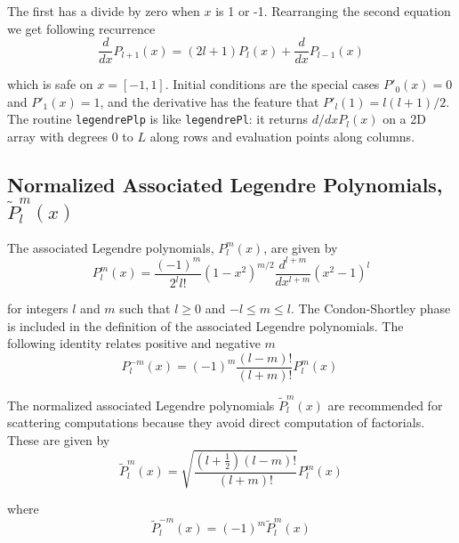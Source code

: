 The first has a divide by zero when $x$ is 1 or -1.  Rearranging the second equation we get following recurrence 
\begin{equation}
\dfrac{d}{dx}P_{l+1}(x) = (2l+1)P_l(x) + \dfrac{d}{dx} P_{l-1}(x)
\end{equation}

\noindent which is safe on $x=[-1, 1]$.  Initial conditions are the special cases $P'_0(x) = 0$ and $P'_1(x) = 1$, and the derivative has the feature that $P'_l(1) = l(l+1)/2$.  The routine \texttt{legendrePlp} is like \texttt{legendrePl}: it returns $d/dx P_l(x)$ on a 2D array with degrees $0$ to $L$ along rows and evaluation points along columns.  

{\footnotesize
{}
}

\clearpage
{}
\subsection{Normalized Associated Legendre Polynomials, $\widetilde{P}_l^m(x)$}


The associated Legendre polynomials, $P_l^m(x)$, are given by
\begin{equation}
P_l^m(x) = \dfrac{(-1)^m}{2^l l!} (1-x^2)^{m/2} \dfrac{d^{l+m}}{dx^{l+m}} (x^2 - 1)^l \label{plm}
\end{equation}

\noindent for integers $l$ and $m$ such that $l \ge 0$ and $-l \le m \le l$.  The Condon-Shortley phase is included in the definition of the associated Legendre polynomials. The following identity relates positive and negative $m$
\begin{equation}
P_l^{-m}(x) = (-1)^m \dfrac{(l-m)!}{(l+m)!} P_l^m(x)\
\label{eq2}
\end{equation}

The normalized associated Legendre polynomials $\widetilde P_l^m(x)$ are recommended for scattering computations because they avoid direct computation of factorials. These are given by
\begin{equation}
\widetilde P_l^m(x) = \sqrt{\dfrac{(l + \frac{1}{2})(l-m)!}{(l+m)!}} P_l^m(x) \label{plmnorm}
\end{equation}

\noindent where
\begin{equation}
\widetilde P_l^{-m}(x) = (-1)^m \widetilde{P}_l^m(x)
\end{equation}

